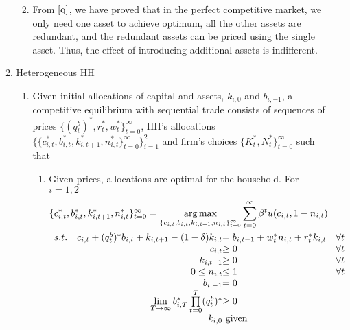 \documentclass{article}
\DeclareMathOperator*{\argmax}{arg\,max}
\begin{document}
\begin{enumerate}
\begin{enumerate}
\begin{enumerate}
\begin{equation*}
                \end{equation*}
                \item From \(\eqref{q}\), we have proved that in the perfect competitive market, we only need one asset to achieve optimum, all the
                other assets are redundant, and the redundant assets can be priced using the single asset. Thus, the effect of introducing additional assets is indifferent.
            \end{enumerate}
            \item Heterogeneous HH
            \begin{enumerate}
                \item Given initial allocations of capital and assets, $k_{i,0}$ and \(b_{i,-1}\), a competitive equilibrium with sequential trade consists of
                sequences of prices $\{(q_{t}^b)^\ast,r_{t}^\ast,w_{t}^\ast\}_{t=0}^\infty$,
                HH's allocations \(\{\{c_{i,t}^\ast,b_{i,t}^\ast,k_{i,t+1}^\ast,n_{i,t}^\ast\}_{t=0}^\infty\}_{i=1}^2\) and
                firm's choices \(\{K_{t}^\ast,N_{t}^\ast\}_{t=0}^\infty\) such that
                \begin{enumerate}[label=\arabic*)]
                    \item Given prices, allocations are optimal for the household. For $i=1,2$
                    \begin{align*}
                        &\{c_{i,t}^\ast,b_{i,t}^\ast,k_{i,t+1}^\ast,n_{i,t}^\ast\}_{t=0}^\infty=\argmax_{\{c_{i,t},b_{i,t},k_{i,t+1},n_{i,t}\}_{t=0}^\infty}\sum_{t=0}^\infty\beta^tu(c_{i,t},1-n_{i,t})\\
                        &\begin{array}{r@{\quad}r@{}l@{\quad}l}
                        s.t.&c_{i,t}+(q_{t}^b)^\ast b_{i,t}+k_{i,t+1}-(1-\delta)k_{i,t}&= b_{i,t-1}+w_{t}^\ast n_{i,t}+r_t^\ast k_{i,t}&\forall t\\
                        &c_{i,t}&\ge0 &\forall t\\
                        &k_{i,t+1}&\ge0 &\forall t\\
                        &0\le n_{i,t}&\le1 &\forall t\\
                        &b_{i,-1}&=0\\
                        &\lim\limits_{T\to\infty}b_{i,T}^\ast\prod\limits_{t=0}^T(q_{t}^b)^\ast&\ge0\\
                        &k_{i,0}&\text{ given}
                        \end{array} 

\end{align*}
\end{enumerate}
\end{enumerate}
\end{enumerate}
\end{enumerate}
\end{document}
